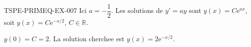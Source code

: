 \begin{corrige}{TSPE-PRIMEQ-EX-007}
Ici $a = -\dfrac{1}{2}$. Les solutions de $y'=ay$ sont $y(x) = C\mathrm{e}^{ax}$, soit $y(x) = C\mathrm{e}^{-x/2}$, $C \in \mathbb{R}$.

$y(0) = C = 2$. La solution cherchee est $\boxed{y(x) = 2\mathrm{e}^{-x/2}}$.
\end{corrige}
